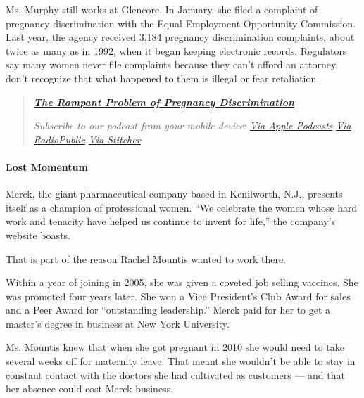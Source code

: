 Ms. Murphy still works at Glencore. In January, she filed a complaint of
pregnancy discrimination with the Equal Employment Opportunity
Commission. Last year, the agency received 3,184 pregnancy
discrimination complaints, about twice as many as in 1992, when it began
keeping electronic records. Regulators say many women never file
complaints because they can't afford an attorney, don't recognize that
what happened to them is illegal or fear retaliation.

\begin{quote}
\textbf{\href{https://www.nytimes3xbfgragh.onion/2018/06/26/podcasts/the-daily/pregnancy-discrimination.html}{\emph{The
Rampant Problem of Pregnancy Discrimination}}}

\emph{Subscribe to our podcast from your mobile device}:
\href{https://itunes.apple.com/us/podcast/the-daily/id1200361736?mt=2}{\emph{Via
Apple Podcasts}} \textbar{}
\emph{\href{https://play.radiopublic.com/88f7d8c3-7289-4dc6-b300-5ba71b43f5e5}{Via
RadioPublic} \textbar{}
\href{http://www.stitcher.com/podcast/the-new-york-times/the-daily-10}{Via
Stitcher}}
\end{quote}

\hypertarget{lost-momentum}{%
\paragraph{Lost Momentum}\label{lost-momentum}}

Merck, the giant pharmaceutical company based in Kenilworth, N.J.,
presents itself as a champion of professional women. ``We celebrate the
women whose hard work and tenacity have helped us continue to invent for
life,''
\href{https://www.merck.com/about/featured-stories/women-in-science.html}{the
company's website boasts}.

That is part of the reason Rachel Mountis wanted to work there.

Within a year of joining in 2005, she was given a coveted job selling
vaccines. She was promoted four years later. She won a Vice President's
Club Award for sales and a Peer Award for ``outstanding leadership.''
Merck paid for her to get a master's degree in business at New York
University.

Ms. Mountis knew that when she got pregnant in 2010 she would need to
take several weeks off for maternity leave. That meant she wouldn't be
able to stay in constant contact with the doctors she had cultivated as
customers --- and that her absence could cost Merck business.

